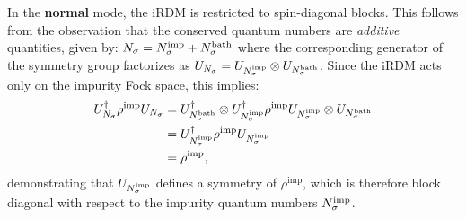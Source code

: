 \documentclass[edipack2.tex]{subfiles}
\begin{document}
In the {\bf normal} mode, the iRDM is restricted to 
{spin-diagonal} blocks. This follows from the observation 
that the conserved quantum numbers are 
\emph{additive} quantities, given by:
$N_\sigma = N_\sigma^\mathrm{imp} + N_\sigma^\mathrm{bath}$
where the corresponding generator of the symmetry group factorizes as
$U_{N_\sigma} = U_{N_\sigma^\mathrm{imp}} \otimes U_{N_\sigma^\mathrm{bath}}$. 
Since the iRDM acts only on the impurity Fock space, this implies:
\begin{equation}
\begin{aligned}
U_{N_\sigma}^\dagger \rho^\mathrm{imp} U_{N_\sigma} &= 
U_{N_\sigma^\mathrm{bath}}^\dagger \otimes U_{N_\sigma^\mathrm{imp}}^\dagger 
\rho^\mathrm{imp} 
U_{N_\sigma^\mathrm{imp}} \otimes U_{N_\sigma^\mathrm{bath}} \\
&= 
U_{N_\sigma^\mathrm{imp}}^\dagger \rho^\mathrm{imp} U_{N_\sigma^\mathrm{imp}}\\
& = 
\rho^\mathrm{imp},
\end{aligned}
\end{equation}
demonstrating that $U_{N_\sigma^\mathrm{imp}}$ defines a symmetry of 
$\rho^\mathrm{imp}$, which is therefore block diagonal with respect to 
the impurity quantum numbers $N_\sigma^\mathrm{imp}$.
\end{document}
